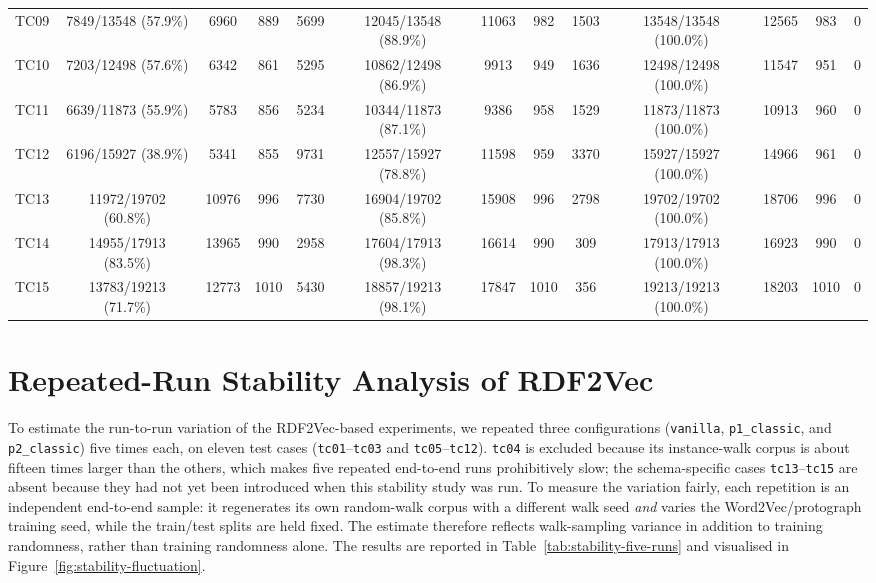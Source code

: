 \documentclass[a4paper,oneside,bibliography=totoc]{scrbook}
\begin{document}
\begin{table}[ht]
{\begin{tabular}{lcccccccccccc}
TC09 & 7849/13548 (57.9\%) & 6960 & 889 & 5699 & 12045/13548 (88.9\%) & 11063 & 982 & 1503 & 13548/13548 (100.0\%) & 12565 & 983 & 0 \\
TC10 & 7203/12498 (57.6\%) & 6342 & 861 & 5295 & 10862/12498 (86.9\%) & 9913 & 949 & 1636 & 12498/12498 (100.0\%) & 11547 & 951 & 0 \\
TC11 & 6639/11873 (55.9\%) & 5783 & 856 & 5234 & 10344/11873 (87.1\%) & 9386 & 958 & 1529 & 11873/11873 (100.0\%) & 10913 & 960 & 0 \\
TC12 & 6196/15927 (38.9\%) & 5341 & 855 & 9731 & 12557/15927 (78.8\%) & 11598 & 959 & 3370 & 15927/15927 (100.0\%) & 14966 & 961 & 0 \\
TC13 & 11972/19702 (60.8\%) & 10976 & 996 & 7730 & 16904/19702 (85.8\%) & 15908 & 996 & 2798 & 19702/19702 (100.0\%) & 18706 & 996 & 0 \\
TC14 & 14955/17913 (83.5\%) & 13965 & 990 & 2958 & 17604/17913 (98.3\%) & 16614 & 990 & 309 & 17913/17913 (100.0\%) & 16923 & 990 & 0 \\
TC15 & 13783/19213 (71.7\%) & 12773 & 1010 & 5430 & 18857/19213 (98.1\%) & 17847 & 1010 & 356 & 19213/19213 (100.0\%) & 18203 & 1010 & 0 \\
\bottomrule
\end{tabular}%
}
\end{table}

\section{Repeated-Run Stability Analysis of RDF2Vec}
\label{app:stability-analysis}

To estimate the run-to-run variation of the RDF2Vec-based experiments, we repeated three configurations (\texttt{vanilla}, \texttt{p1\_classic}, and \texttt{p2\_classic}) five times each, on eleven test cases (\texttt{tc01}--\texttt{tc03} and \texttt{tc05}--\texttt{tc12}). \texttt{tc04} is excluded because its instance-walk corpus is about fifteen times larger than the others, which makes five repeated end-to-end runs prohibitively slow; the schema-specific cases \texttt{tc13}--\texttt{tc15} are absent because they had not yet been introduced when this stability study was run. To measure the variation fairly, each repetition is an independent end-to-end sample: it regenerates its own random-walk corpus with a different walk seed \emph{and} varies the Word2Vec/protograph training seed, while the train/test splits are held fixed. The estimate therefore reflects walk-sampling variance in addition to training randomness, rather than training randomness alone. The results are reported in Table~\ref{tab:stability-five-runs} and visualised in Figure~\ref{fig:stability-fluctuation}.
\end{document}
